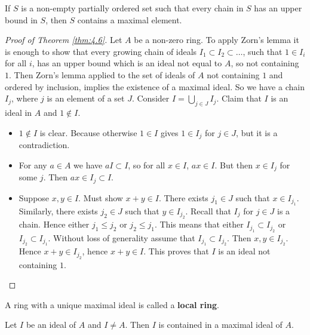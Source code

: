 \begin{theorem}
If $ S $ is a non-empty partially ordered set such that every chain in $ S $ has an upper bound in $ S $, then $ S $ contains a maximal element.
\end{theorem}

\begin{proof}[Proof of Theorem \ref{thm:4.6}]
Let $ A $ be a non-zero ring. To apply Zorn's lemma it is enough to show that every growing chain of ideals $ I_1 \subset I_2 \subset \dots $, such that $ 1 \in I_i $ for all $ i $, has an upper bound which is an ideal not equal to $ A $, so not containing $ 1 $. Then Zorn's lemma applied to the set of ideals of $ A $ not containing $ 1 $ and ordered by inclusion, implies the existence of a maximal ideal. So we have a chain $ I_j $, where $ j $ is an element of a set $ J $. Consider $ I = \bigcup_{j \in J} I_j $. Claim that $ I $ is an ideal in $ A $ and $ 1 \notin I $.
\begin{itemize}
\item $ 1 \notin I $ is clear. Because otherwise $ 1 \in I $ gives $ 1 \in I_j $ for $ j \in J $, but it is a contradiction.
\item For any $ a \in A $ we have $ aI \subset I $, so for all $ x \in I $, $ ax \in I $. But then $ x \in I_j $ for some $ j $. Then $ ax \in I_j \subset I $.
\item Suppose $ x, y \in I $. Must show $ x + y \in I $. There exists $ j_1 \in J $ such that $ x \in I_{j_1} $. Similarly, there exists $ j_2 \in J $ such that $ y \in I_{j_2} $. Recall that $ I_j $ for $ j \in J $ is a chain. Hence either $ j_1 \le j_2 $ or $ j_2 \le j_1 $. This means that either $ I_{j_1} \subset I_{j_2} $ or $ I_{j_2} \subset I_{j_1} $. Without loss of generality assume that $ I_{j_1} \subset I_{j_2} $. Then $ x, y \in I_{j_2} $. Hence $ x + y \in I_{j_2} $, hence $ x + y \in I $. This proves that $ I $ is an ideal not containing $ 1 $.
\end{itemize}
\end{proof}

\pagebreak

\begin{definition}
A ring with a unique maximal ideal is called a \textbf{local ring}.
\end{definition}

\begin{corollary}
\label{cor:4.9}
Let $ I $ be an ideal of $ A $ and $ I \ne A $. Then $ I $ is contained in a maximal ideal of $ A $.
\end{corollary}

